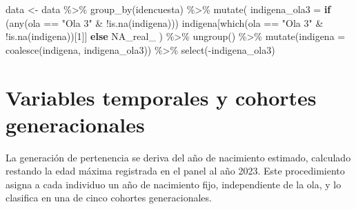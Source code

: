 \documentclass[
  spanish,
  a4paper,
  oneside]{scrbook}
\newenvironment{Shaded}{\begin{snugshade}}{\end{snugshade}}
\newcommand{\AttributeTok}[1]{\textcolor[rgb]{0.40,0.45,0.13}{#1}}
\newcommand{\ConstantTok}[1]{\textcolor[rgb]{0.56,0.35,0.01}{#1}}
\newcommand{\ControlFlowTok}[1]{\textcolor[rgb]{0.00,0.23,0.31}{\textbf{#1}}}
\newcommand{\DecValTok}[1]{\textcolor[rgb]{0.68,0.00,0.00}{#1}}
\newcommand{\FunctionTok}[1]{\textcolor[rgb]{0.28,0.35,0.67}{#1}}
\newcommand{\NormalTok}[1]{\textcolor[rgb]{0.00,0.23,0.31}{#1}}
\newcommand{\OtherTok}[1]{\textcolor[rgb]{0.00,0.23,0.31}{#1}}
\newcommand{\SpecialCharTok}[1]{\textcolor[rgb]{0.37,0.37,0.37}{#1}}
\newcommand{\StringTok}[1]{\textcolor[rgb]{0.13,0.47,0.30}{#1}}
\begin{document}
\begin{Shaded}
\begin{Highlighting}[]
\NormalTok{data }\OtherTok{\textless{}{-}}\NormalTok{ data }\SpecialCharTok{\%\textgreater{}\%}
  \FunctionTok{group\_by}\NormalTok{(idencuesta) }\SpecialCharTok{\%\textgreater{}\%}
  \FunctionTok{mutate}\NormalTok{(}
    \AttributeTok{indigena\_ola3 =} \ControlFlowTok{if}\NormalTok{ (}\FunctionTok{any}\NormalTok{(ola }\SpecialCharTok{==} \StringTok{"Ola 3"} \SpecialCharTok{\&} \SpecialCharTok{!}\FunctionTok{is.na}\NormalTok{(indigena)))}
\NormalTok{      indigena[}\FunctionTok{which}\NormalTok{(ola }\SpecialCharTok{==} \StringTok{"Ola 3"} \SpecialCharTok{\&} \SpecialCharTok{!}\FunctionTok{is.na}\NormalTok{(indigena))[}\DecValTok{1}\NormalTok{]]}
    \ControlFlowTok{else} \ConstantTok{NA\_real\_}
\NormalTok{  ) }\SpecialCharTok{\%\textgreater{}\%}
  \FunctionTok{ungroup}\NormalTok{() }\SpecialCharTok{\%\textgreater{}\%}
  \FunctionTok{mutate}\NormalTok{(}\AttributeTok{indigena =} \FunctionTok{coalesce}\NormalTok{(indigena, indigena\_ola3)) }\SpecialCharTok{\%\textgreater{}\%}
  \FunctionTok{select}\NormalTok{(}\SpecialCharTok{{-}}\NormalTok{indigena\_ola3)}
\end{Highlighting}
\end{Shaded}

\chapter{Variables temporales y cohortes
generacionales}\label{variables-temporales-y-cohortes-generacionales}

La generación de pertenencia se deriva del año de nacimiento estimado,
calculado restando la edad máxima registrada en el panel al año 2023.
Este procedimiento asigna a cada individuo un año de nacimiento fijo,
independiente de la ola, y lo clasifica en una de cinco cohortes
generacionales.
\end{document}
